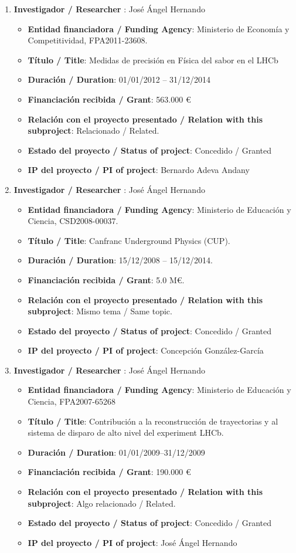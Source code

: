 \begin{enumerate}
\item {\bf Investigador / Researcher }: José Ángel Hernando
\begin{itemize}
\item {\bf Entidad financiadora / Funding Agency}: Ministerio de Econom\'ia y Competitividad, FPA2011-23608.  
\item {\bf Título / Title}:  Medidas de precisi\'on en F\'isica del sabor en el LHCb
\item {\bf Duración / Duration}: 01/01/2012 -- 31/12/2014
\item {\bf Financiación recibida / Grant}: 563.000 \euro 
\item {\bf Relación con el proyecto presentado / Relation with this subproject}: Relacionado / Related. 
\item {\bf Estado del proyecto / Status of project}: Concedido / Granted
\item {\bf IP del proyecto / PI of project}: Bernardo Adeva Andany
\end{itemize}
\item {\bf Investigador / Researcher }: José Ángel Hernando
\begin{itemize}
\item {\bf Entidad financiadora / Funding Agency}: Ministerio de Educaci\'on y Ciencia, CSD2008-00037.
\item {\bf Título / Title}:  Canfranc Underground Physics (CUP).
\item {\bf Duración / Duration}: 15/12/2008 -- 15/12/2014. 
\item {\bf Financiación recibida / Grant}: 5.0 M\euro. 
\item {\bf Relación con el proyecto presentado / Relation with this subproject}: Mismo tema / Same topic. 
\item {\bf Estado del proyecto / Status of project}: Concedido / Granted
\item {\bf IP del proyecto / PI of project}: Concepción González-García 
\end{itemize}
\item {\bf Investigador / Researcher }: José Ángel Hernando
\begin{itemize}
\item {\bf Entidad financiadora / Funding Agency}: Ministerio de Educaci\'on y Ciencia, FPA2007-65268
\item {\bf Título / Title}:  Contribuci\'on a la reconstrucci\'on de trayectorias y al sistema de disparo de alto nivel del experiment LHCb.
\item {\bf Duración / Duration}: 01/01/2009--31/12/2009
\item {\bf Financiación recibida / Grant}: 190.000 \euro 
\item {\bf Relación con el proyecto presentado / Relation with this subproject}: Algo relacionado / Related. 
\item {\bf Estado del proyecto / Status of project}: Concedido / Granted
\item {\bf IP del proyecto / PI of project}: José Ángel Hernando
\end{itemize}
\end{enumerate}

